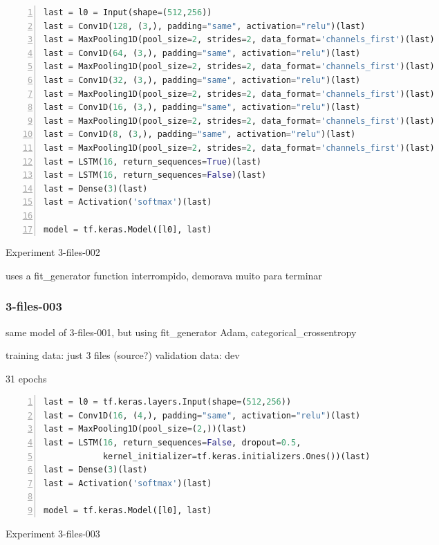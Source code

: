 \noindent
\begin{algorithm}
\begin{lstlisting}[language=Python, frame=single, numbers=left]
last = l0 = Input(shape=(512,256))
last = Conv1D(128, (3,), padding="same", activation="relu")(last)
last = MaxPooling1D(pool_size=2, strides=2, data_format='channels_first')(last)
last = Conv1D(64, (3,), padding="same", activation="relu")(last)
last = MaxPooling1D(pool_size=2, strides=2, data_format='channels_first')(last)
last = Conv1D(32, (3,), padding="same", activation="relu")(last)
last = MaxPooling1D(pool_size=2, strides=2, data_format='channels_first')(last)
last = Conv1D(16, (3,), padding="same", activation="relu")(last)
last = MaxPooling1D(pool_size=2, strides=2, data_format='channels_first')(last)
last = Conv1D(8, (3,), padding="same", activation="relu")(last)
last = MaxPooling1D(pool_size=2, strides=2, data_format='channels_first')(last)
last = LSTM(16, return_sequences=True)(last)
last = LSTM(16, return_sequences=False)(last)
last = Dense(3)(last)
last = Activation('softmax')(last)

model = tf.keras.Model([l0], last)
\end{lstlisting}
\caption{\label{alg:3-files-002}Experiment 3-files-002}
\end{algorithm}

uses a fit\_generator function
interrompido, demorava muito para terminar

\subsubsection{3-files-003}

same model of 3-files-001, but using fit\_generator
Adam, categorical\_crossentropy

training data: just 3 files (source?)
validation data: dev


31 epochs
\noindent
\begin{algorithm}
\begin{lstlisting}[language=Python, frame=single, numbers=left]
last = l0 = tf.keras.layers.Input(shape=(512,256))
last = Conv1D(16, (4,), padding="same", activation="relu")(last)
last = MaxPooling1D(pool_size=(2,))(last)
last = LSTM(16, return_sequences=False, dropout=0.5,
            kernel_initializer=tf.keras.initializers.Ones())(last)
last = Dense(3)(last)
last = Activation('softmax')(last)

model = tf.keras.Model([l0], last)
\end{lstlisting}
\caption{\label{alg:3-files-003}Experiment 3-files-003}
\end{algorithm}

